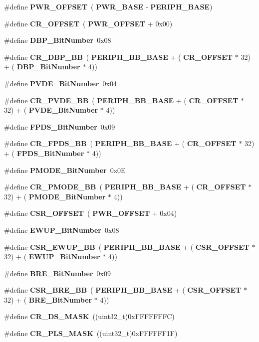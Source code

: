 \begin{DoxyCompactItemize}
\item 
\#define \textbf{ P\+W\+R\+\_\+\+O\+F\+F\+S\+ET}~(\textbf{ P\+W\+R\+\_\+\+B\+A\+SE} -\/ \textbf{ P\+E\+R\+I\+P\+H\+\_\+\+B\+A\+SE})
\item 
\#define \textbf{ C\+R\+\_\+\+O\+F\+F\+S\+ET}~(\textbf{ P\+W\+R\+\_\+\+O\+F\+F\+S\+ET} + 0x00)
\item 
\#define \textbf{ D\+B\+P\+\_\+\+Bit\+Number}~0x08
\item 
\#define \textbf{ C\+R\+\_\+\+D\+B\+P\+\_\+\+BB}~(\textbf{ P\+E\+R\+I\+P\+H\+\_\+\+B\+B\+\_\+\+B\+A\+SE} + (\textbf{ C\+R\+\_\+\+O\+F\+F\+S\+ET} $\ast$ 32) + (\textbf{ D\+B\+P\+\_\+\+Bit\+Number} $\ast$ 4))
\item 
\#define \textbf{ P\+V\+D\+E\+\_\+\+Bit\+Number}~0x04
\item 
\#define \textbf{ C\+R\+\_\+\+P\+V\+D\+E\+\_\+\+BB}~(\textbf{ P\+E\+R\+I\+P\+H\+\_\+\+B\+B\+\_\+\+B\+A\+SE} + (\textbf{ C\+R\+\_\+\+O\+F\+F\+S\+ET} $\ast$ 32) + (\textbf{ P\+V\+D\+E\+\_\+\+Bit\+Number} $\ast$ 4))
\item 
\#define \textbf{ F\+P\+D\+S\+\_\+\+Bit\+Number}~0x09
\item 
\#define \textbf{ C\+R\+\_\+\+F\+P\+D\+S\+\_\+\+BB}~(\textbf{ P\+E\+R\+I\+P\+H\+\_\+\+B\+B\+\_\+\+B\+A\+SE} + (\textbf{ C\+R\+\_\+\+O\+F\+F\+S\+ET} $\ast$ 32) + (\textbf{ F\+P\+D\+S\+\_\+\+Bit\+Number} $\ast$ 4))
\item 
\#define \textbf{ P\+M\+O\+D\+E\+\_\+\+Bit\+Number}~0x0E
\item 
\#define \textbf{ C\+R\+\_\+\+P\+M\+O\+D\+E\+\_\+\+BB}~(\textbf{ P\+E\+R\+I\+P\+H\+\_\+\+B\+B\+\_\+\+B\+A\+SE} + (\textbf{ C\+R\+\_\+\+O\+F\+F\+S\+ET} $\ast$ 32) + (\textbf{ P\+M\+O\+D\+E\+\_\+\+Bit\+Number} $\ast$ 4))
\item 
\#define \textbf{ C\+S\+R\+\_\+\+O\+F\+F\+S\+ET}~(\textbf{ P\+W\+R\+\_\+\+O\+F\+F\+S\+ET} + 0x04)
\item 
\#define \textbf{ E\+W\+U\+P\+\_\+\+Bit\+Number}~0x08
\item 
\#define \textbf{ C\+S\+R\+\_\+\+E\+W\+U\+P\+\_\+\+BB}~(\textbf{ P\+E\+R\+I\+P\+H\+\_\+\+B\+B\+\_\+\+B\+A\+SE} + (\textbf{ C\+S\+R\+\_\+\+O\+F\+F\+S\+ET} $\ast$ 32) + (\textbf{ E\+W\+U\+P\+\_\+\+Bit\+Number} $\ast$ 4))
\item 
\#define \textbf{ B\+R\+E\+\_\+\+Bit\+Number}~0x09
\item 
\#define \textbf{ C\+S\+R\+\_\+\+B\+R\+E\+\_\+\+BB}~(\textbf{ P\+E\+R\+I\+P\+H\+\_\+\+B\+B\+\_\+\+B\+A\+SE} + (\textbf{ C\+S\+R\+\_\+\+O\+F\+F\+S\+ET} $\ast$ 32) + (\textbf{ B\+R\+E\+\_\+\+Bit\+Number} $\ast$ 4))
\item 
\#define \textbf{ C\+R\+\_\+\+D\+S\+\_\+\+M\+A\+SK}~((uint32\+\_\+t)0x\+F\+F\+F\+F\+F\+F\+F\+C)
\item 
\#define \textbf{ C\+R\+\_\+\+P\+L\+S\+\_\+\+M\+A\+SK}~((uint32\+\_\+t)0x\+F\+F\+F\+F\+F\+F1\+F)
\end{DoxyCompactItemize}


